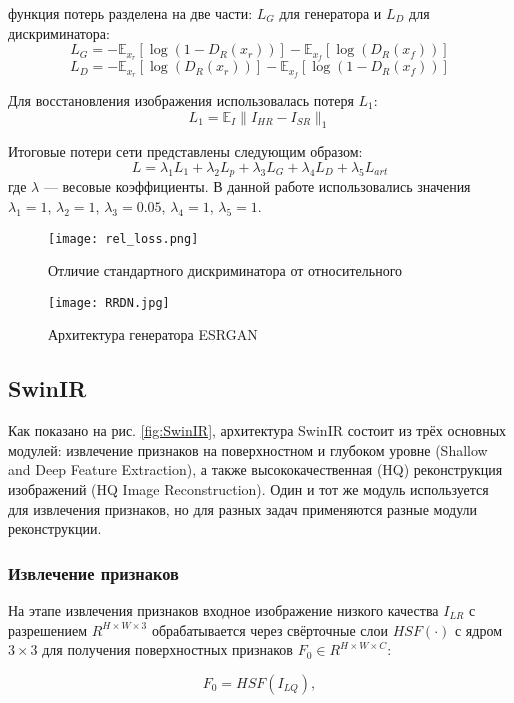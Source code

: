\documentclass[14pt]{extarticle}
\begin{document}
функция потерь разделена на две части: $L_G$ для генератора и $L_D$ для дискриминатора:
$$
L_G = -\mathbb{E}_{x_r}[\log(1 - D_R(x_r))] - \mathbb{E}_{x_f}[\log(D_R(x_f))]
$$
$$
L_D = -\mathbb{E}_{x_r}[\log(D_R(x_r))] - \mathbb{E}_{x_f}[\log(1 - D_R(x_f))]
$$

Для восстановления изображения использовалась потеря $L_1$:
$$
L_1 = \mathbb{E}_I \|I_{HR} - I_{SR}\|_1
$$

Итоговые потери сети представлены следующим образом:
$$
L = \lambda_1 L_1 + \lambda_2 L_p + \lambda_3 L_G + \lambda_4 L_D + \lambda_5 L_{art}
$$
где $\lambda$ — весовые коэффициенты. В данной работе использовались значения $\lambda_1=1$, $\lambda_2=1$, $\lambda_3=0.05$, $\lambda_4=1$, $\lambda_5=1$.



\begin{figure}
    \centering
    \texttt{[image: rel\_loss.png]}
    \caption{Отличие стандартного дискриминатора от относительного}
    \label{fig:rel_loss}
\end{figure}

\begin{figure}
  \texttt{[image: RRDN.jpg]}
  \caption{Архитектура генератора ESRGAN}
  \label{fig:ESRGAN}
\end{figure}

\subsection{SwinIR}
Как показано на рис. \ref{fig:SwinIR}, архитектура SwinIR \cite{Liang2021SwinIRIR} состоит из трёх основных модулей: извлечение признаков на поверхностном и глубоком уровне (Shallow and Deep Feature Extraction), а также высококачественная (HQ) реконструкция изображений (HQ Image Reconstruction). Один и тот же модуль используется для извлечения признаков, но для разных задач применяются разные модули реконструкции.

\subsubsection{Извлечение признаков}

На этапе извлечения признаков входное изображение низкого качества $I_{LR}$ с разрешением $R^{H \times W \times 3}$ обрабатывается через свёрточные слои $HSF(\cdot)$ с ядром $3 \times 3$ для получения поверхностных признаков $F_0 \in R^{H \times W \times C}$:

$$
    F_0 = HSF(I_{LQ}),
$$
\end{document}
